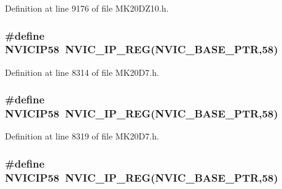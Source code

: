 Definition at line 9176 of file M\+K20\+D\+Z10.\+h.

\subsubsection[{\texorpdfstring{N\+V\+I\+C\+I\+P58}{NVICIP58}}]{\setlength{\rightskip}{0pt plus 5cm}\#define N\+V\+I\+C\+I\+P58~{\bf N\+V\+I\+C\+\_\+\+I\+P\+\_\+\+R\+EG}({\bf N\+V\+I\+C\+\_\+\+B\+A\+S\+E\+\_\+\+P\+TR},58)}\hypertarget{group___n_v_i_c___register___accessor___macros_gaf5156b7acf03e450478a53ae51341b79}{}\label{group___n_v_i_c___register___accessor___macros_gaf5156b7acf03e450478a53ae51341b79}


Definition at line 8314 of file M\+K20\+D7.\+h.

\subsubsection[{\texorpdfstring{N\+V\+I\+C\+I\+P58}{NVICIP58}}]{\setlength{\rightskip}{0pt plus 5cm}\#define N\+V\+I\+C\+I\+P58~{\bf N\+V\+I\+C\+\_\+\+I\+P\+\_\+\+R\+EG}({\bf N\+V\+I\+C\+\_\+\+B\+A\+S\+E\+\_\+\+P\+TR},58)}\hypertarget{group___n_v_i_c___register___accessor___macros_gaf5156b7acf03e450478a53ae51341b79}{}\label{group___n_v_i_c___register___accessor___macros_gaf5156b7acf03e450478a53ae51341b79}


Definition at line 8319 of file M\+K20\+D7.\+h.

\subsubsection[{\texorpdfstring{N\+V\+I\+C\+I\+P58}{NVICIP58}}]{\setlength{\rightskip}{0pt plus 5cm}\#define N\+V\+I\+C\+I\+P58~{\bf N\+V\+I\+C\+\_\+\+I\+P\+\_\+\+R\+EG}({\bf N\+V\+I\+C\+\_\+\+B\+A\+S\+E\+\_\+\+P\+TR},58)}\hypertarget{group___n_v_i_c___register___accessor___macros_gaf5156b7acf03e450478a53ae51341b79}{}\label{group___n_v_i_c___register___accessor___macros_gaf5156b7acf03e450478a53ae51341b79}


